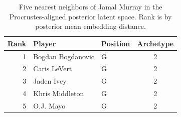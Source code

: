 \begin{table}[htbp]
  \centering\small
  \begin{tabular}{rllc}
    \toprule
    Rank & Player & Position & Archetype \\
    \midrule
    1 & Bogdan Bogdanovic & G & 2 \\
    2 & Caris LeVert & G & 2 \\
    3 & Jaden Ivey & G & 2 \\
    4 & Khris Middleton & G & 2 \\
    5 & O.J. Mayo & G & 2 \\
    \bottomrule
  \end{tabular}
  \caption{Five nearest neighbors of Jamal Murray in the Procrustes-aligned posterior latent space. Rank is by posterior mean embedding distance.}
  \label{tab:Jamal_Murray_neighbors}
\end{table}

